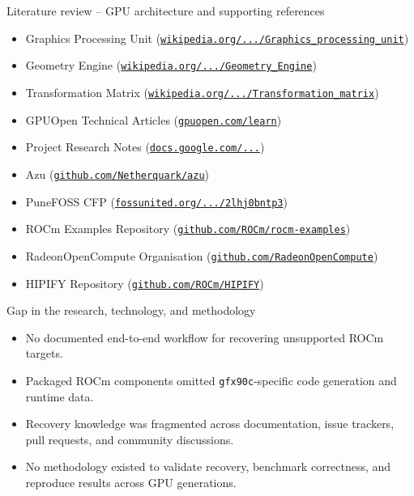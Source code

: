 \documentclass[aspectratio=43,9pt]{beamer}
\begin{document}
\begin{frame}{Literature review -- GPU architecture and supporting references}
\begin{itemize}
    \item Graphics Processing Unit (\href{https://en.wikipedia.org/wiki/Graphics_processing_unit}{\texttt{wikipedia.org/.../Graphics\_processing\_unit}})
    \item Geometry Engine (\href{https://en.wikipedia.org/wiki/Geometry_Engine}{\texttt{wikipedia.org/.../Geometry\_Engine}})
    \item Transformation Matrix (\href{https://en.wikipedia.org/wiki/Transformation_matrix}{\texttt{wikipedia.org/.../Transformation\_matrix}})
    \item GPUOpen Technical Articles (\href{https://gpuopen.com/learn/}{\texttt{gpuopen.com/learn}})
    \item Project Research Notes (\href{https://docs.google.com/document/d/1dZ3vF8GE8_gx6t152sOaUVEPq0ybmailxvu3uk89_is/edit}{\texttt{docs.google.com/...}})
    \item Azu (\href{https://github.com/Netherquark/azu}{\texttt{github.com/Netherquark/azu}})
    \item PuneFOSS CFP (\href{https://fossunited.org/c/pune/punefoss4/cfp/2lhj0bntp3}{\texttt{fossunited.org/.../2lhj0bntp3}})
    \item ROCm Examples Repository (\href{https://github.com/ROCm/rocm-examples}{\texttt{github.com/ROCm/rocm-examples}})
    \item RadeonOpenCompute Organisation (\href{https://github.com/RadeonOpenCompute}{\texttt{github.com/RadeonOpenCompute}})
    \item HIPIFY Repository (\href{https://github.com/ROCm/HIPIFY}{\texttt{github.com/ROCm/HIPIFY}})
\end{itemize}
\end{frame}

\begin{frame}{Gap in the research, technology, and methodology}
\vspace{-0.5cm}
\begin{itemize}
        \item No documented end-to-end workflow for recovering unsupported ROCm targets.
        \item Packaged ROCm components omitted \texttt{gfx90c}-specific code generation and runtime data.
        \item Recovery knowledge was fragmented across documentation, issue trackers, pull requests, and community discussions.
        \item No methodology existed to validate recovery, benchmark correctness, and reproduce results across GPU generations.
    \end{itemize}
\end{frame}
\end{document}
